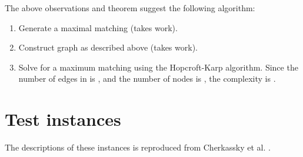 \documentclass{article}
\begin{document}
The above observations and theorem suggest the following algorithm:
\begin{enumerate}
\item Generate a maximal matching (takes  work).
\item Construct graph  as described above (takes  work).
\item Solve for a maximum matching using the Hopcroft-Karp algorithm. Since the number of edges in  is , and the number of nodes is , the complexity is .
\end{enumerate}

\section{Test instances}
\label{sec:instances}


The descriptions of these instances is reproduced from Cherkassky et al. \cite{CheGMSS98}.
\end{document}
